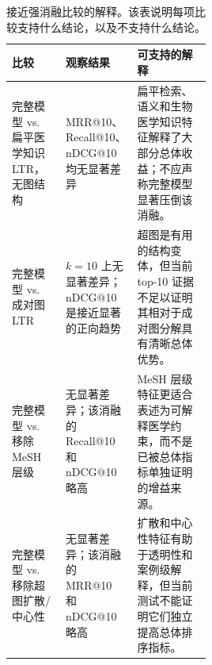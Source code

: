 \begin{table}[t]
\centering
\small
\caption{接近强消融比较的解释。该表说明每项比较支持什么结论，以及不支持什么结论。}
\label{tab:strong-ablation-interpretation}
\begin{tabularx}{\linewidth}{p{0.27\linewidth}p{0.23\linewidth}X}
\toprule
比较 & 观察结果 & 可支持的解释 \\
\midrule
完整模型 vs. 扁平医学知识 LTR，无图结构 & MRR@10、Recall@10、nDCG@10 均无显著差异 & 扁平检索、语义和生物医学知识特征解释了大部分总体收益；不应声称完整模型显著压倒该消融。 \\
完整模型 vs. 成对图 LTR & $k=10$ 上无显著差异；nDCG@10 是接近显著的正向趋势 & 超图是有用的结构变体，但当前 top-10 证据不足以证明其相对于成对图分解具有清晰总体优势。 \\
完整模型 vs. 移除 MeSH 层级 & 无显著差异；该消融的 Recall@10 和 nDCG@10 略高 & MeSH 层级特征更适合表述为可解释医学约束，而不是已被总体指标单独证明的增益来源。 \\
完整模型 vs. 移除超图扩散/中心性 & 无显著差异；该消融的 MRR@10 和 nDCG@10 略高 & 扩散和中心性特征有助于透明性和案例级解释，但当前测试不能证明它们独立提高总体排序指标。 \\
\bottomrule
\end{tabularx}
\end{table}
